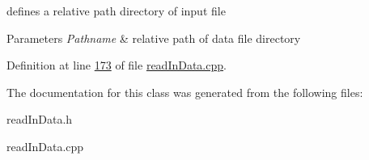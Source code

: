 defines a relative path directory of input file 


\begin{DoxyParams}{Parameters}
{\em Pathname} & relative path of data file directory \\
\hline
\end{DoxyParams}


Definition at line \hyperlink{read_in_data_8cpp_source_l00173}{173} of file \hyperlink{read_in_data_8cpp_source}{read\+In\+Data.\+cpp}.



The documentation for this class was generated from the following files\+:\begin{DoxyCompactItemize}
\item 
read\+In\+Data.\+h\item 
read\+In\+Data.\+cpp\end{DoxyCompactItemize}
